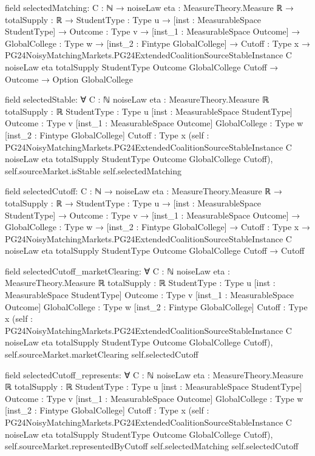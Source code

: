 \documentclass[10pt]{article}
\begin{document}
\begin{ReviewVerbatim}
field selectedMatching:
{C : ℕ} →
  {noiseLaw eta : MeasureTheory.Measure ℝ} →
    {totalSupply : ℝ} →
      {StudentType : Type u} →
        [inst : MeasurableSpace StudentType] →
          {Outcome : Type v} →
            [inst_1 : MeasurableSpace Outcome] →
              {GlobalCollege : Type w} →
                [inst_2 : Fintype GlobalCollege] →
                  {Cutoff : Type x} →
                    PG24NoisyMatchingMarkets.PG24ExtendedCoalitionSourceStableInstance C noiseLaw eta totalSupply
                        StudentType Outcome GlobalCollege Cutoff →
                      Outcome → Option GlobalCollege

field selectedStable:
∀ {C : ℕ} {noiseLaw eta : MeasureTheory.Measure ℝ} {totalSupply : ℝ} {StudentType : Type u}
  [inst : MeasurableSpace StudentType] {Outcome : Type v} [inst_1 : MeasurableSpace Outcome] {GlobalCollege : Type w}
  [inst_2 : Fintype GlobalCollege] {Cutoff : Type x}
  (self :
    PG24NoisyMatchingMarkets.PG24ExtendedCoalitionSourceStableInstance C noiseLaw eta totalSupply StudentType Outcome
      GlobalCollege Cutoff),
  self.sourceMarket.isStable self.selectedMatching

field selectedCutoff:
{C : ℕ} →
  {noiseLaw eta : MeasureTheory.Measure ℝ} →
    {totalSupply : ℝ} →
      {StudentType : Type u} →
        [inst : MeasurableSpace StudentType] →
          {Outcome : Type v} →
            [inst_1 : MeasurableSpace Outcome] →
              {GlobalCollege : Type w} →
                [inst_2 : Fintype GlobalCollege] →
                  {Cutoff : Type x} →
                    PG24NoisyMatchingMarkets.PG24ExtendedCoalitionSourceStableInstance C noiseLaw eta totalSupply
                        StudentType Outcome GlobalCollege Cutoff →
                      Cutoff

field selectedCutoff_marketClearing:
∀ {C : ℕ} {noiseLaw eta : MeasureTheory.Measure ℝ} {totalSupply : ℝ} {StudentType : Type u}
  [inst : MeasurableSpace StudentType] {Outcome : Type v} [inst_1 : MeasurableSpace Outcome] {GlobalCollege : Type w}
  [inst_2 : Fintype GlobalCollege] {Cutoff : Type x}
  (self :
    PG24NoisyMatchingMarkets.PG24ExtendedCoalitionSourceStableInstance C noiseLaw eta totalSupply StudentType Outcome
      GlobalCollege Cutoff),
  self.sourceMarket.marketClearing self.selectedCutoff

field selectedCutoff_represents:
∀ {C : ℕ} {noiseLaw eta : MeasureTheory.Measure ℝ} {totalSupply : ℝ} {StudentType : Type u}
  [inst : MeasurableSpace StudentType] {Outcome : Type v} [inst_1 : MeasurableSpace Outcome] {GlobalCollege : Type w}
  [inst_2 : Fintype GlobalCollege] {Cutoff : Type x}
  (self :
    PG24NoisyMatchingMarkets.PG24ExtendedCoalitionSourceStableInstance C noiseLaw eta totalSupply StudentType Outcome
      GlobalCollege Cutoff),
  self.sourceMarket.representedByCutoff self.selectedMatching self.selectedCutoff


\end{ReviewVerbatim}
\end{document}
